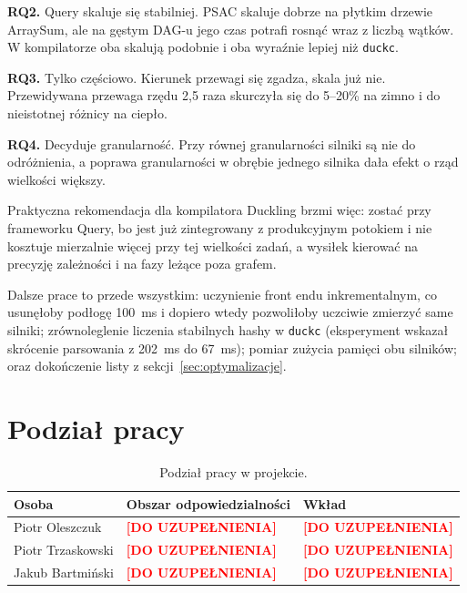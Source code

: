 \documentclass[11pt,a4paper]{article}
\newcommand{\dopisz}{\textcolor{red}{\textbf{[DO UZUPEŁNIENIA]}}}
\begin{document}
\textbf{RQ2.} Query skaluje się stabilniej. PSAC skaluje dobrze na płytkim
drzewie ArraySum, ale na gęstym DAG-u jego czas potrafi rosnąć wraz z liczbą
wątków. W kompilatorze oba skalują podobnie i oba wyraźnie lepiej niż
\texttt{duckc}.

\textbf{RQ3.} Tylko częściowo. Kierunek przewagi się zgadza, skala już nie.
Przewidywana przewaga rzędu 2,5 raza skurczyła się do 5--20\% na zimno i do
nieistotnej różnicy na ciepło.

\textbf{RQ4.} Decyduje granularność. Przy równej granularności silniki są nie do
odróżnienia, a poprawa granularności w obrębie jednego silnika dała efekt o rząd
wielkości większy.

Praktyczna rekomendacja dla kompilatora Duckling brzmi więc: zostać przy
frameworku Query, bo jest już zintegrowany z produkcyjnym potokiem i nie kosztuje
mierzalnie więcej przy tej wielkości zadań, a wysiłek kierować na precyzję
zależności i na fazy leżące poza grafem.

Dalsze prace to przede wszystkim: uczynienie front endu inkrementalnym, co
usunęłoby podłogę 100~ms i dopiero wtedy pozwoliłoby uczciwie zmierzyć same
silniki; zrównoleglenie liczenia stabilnych hashy w \texttt{duckc} (eksperyment
wskazał skrócenie parsowania z 202~ms do 67~ms); pomiar zużycia pamięci obu
silników; oraz dokończenie listy z sekcji~\ref{sec:optymalizacje}.

\section{Podział pracy}

\begin{table}[htbp]
\centering
\caption{Podział pracy w projekcie.}
\label{tab:podzial}
\small
\begin{tabular}{@{}p{3.6cm}p{6.4cm}p{4.2cm}@{}}
\toprule
\textbf{Osoba} & \textbf{Obszar odpowiedzialności} & \textbf{Wkład} \\
\midrule
Piotr Oleszczuk    & \dopisz & \dopisz \\
Piotr Trzaskowski  & \dopisz & \dopisz \\
Jakub Bartmiński   & \dopisz & \dopisz \\
\bottomrule
\end{tabular}
\end{table}

\printbibliography[title={Bibliografia}]
\end{document}
